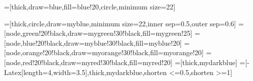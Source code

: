 \usepackage{vub}
\usepackage{amsfonts}
\usepackage{amsmath}
\usepackage{pgfplots}
\usepackage{bm}
\usepackage{amssymb}
\usepackage{graphicx}
\usepackage{tikz}
\usepackage{subcaption}
\usepackage[utf8]{inputenc}
\usepackage{geometry}
\usepackage{multirow}
\usepackage{array, makecell, rotating}
\usepackage{cleveref}
\usepackage{natbib}
\usepackage[toc,page]{appendix}
\usepackage{listofitems} %
\usetikzlibrary{arrows.meta} %
\usepackage[outline]{contour} %
\usepackage[pdftex]{pict2e}
\usepackage{xcolor}
\usepackage{amssymb}

\contourlength{1.4pt}

=[thick,draw=blue,fill=blue!20,circle,minimum size=22]
\tikzset{>=latex} %

=[thick,circle,draw=myblue,minimum size=22,inner sep=0.5,outer sep=0.6]
=[node,green!20!black,draw=mygreen!30!black,fill=mygreen!25]
=[node,blue!20!black,draw=myblue!30!black,fill=myblue!20]
=[node,orange!20!black,draw=myorange!30!black,fill=myorange!20]
=[node,red!20!black,draw=myred!30!black,fill=myred!20]
=[thick,mydarkblue] %
=[-{Latex[length=4,width=3.5]},thick,mydarkblue,shorten <=0.5,shorten >=1]
\def\nstyle{int(\lay<\Nnodlen?min(2,\lay):3)} %


\usetikzlibrary{shapes.geometric, arrows}

